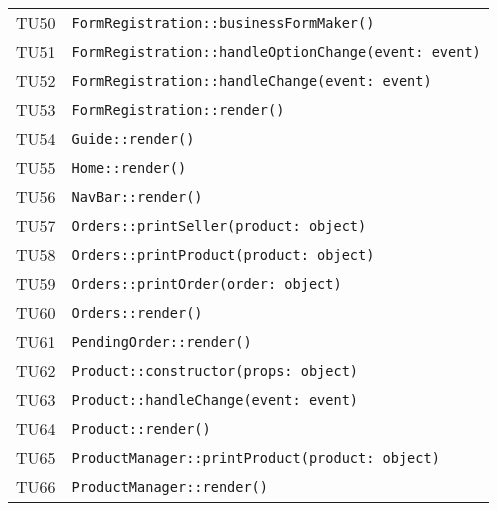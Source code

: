 \begin{longtable}{ >{\centering}p{} >{}p{}}
			\hypertarget{TU50}{TU50} & 
			\texttt{FormRegistration::businessFormMaker()}\\

			\hypertarget{TU51}{TU51} & 
			\texttt{FormRegistration::handleOptionChange(event: event)}\\
			
			\hypertarget{TU52}{TU52} & 
			\texttt{FormRegistration::handleChange(event: event)}\\

			\hypertarget{TU53}{TU53} & 
			\texttt{FormRegistration::render()}\\

			\hypertarget{TU54}{TU54} & 
			\texttt{Guide::render()}\\

			\hypertarget{TU55}{TU55} & 
			\texttt{Home::render()}\\

			\hypertarget{TU56}{TU56} & 
			\texttt{NavBar::render()}\\

			\hypertarget{TU57}{TU57} & 
			\texttt{Orders::printSeller(product: object)}\\

			\hypertarget{TU58}{TU58} & 
			\texttt{Orders::printProduct(product: object)}\\

			\hypertarget{TU59}{TU59} & 
			\texttt{Orders::printOrder(order: object)}\\

			\hypertarget{TU60}{TU60} & 
			\texttt{Orders::render()}\\

			\hypertarget{TU61}{TU61} & 
			\texttt{PendingOrder::render()}\\

			\hypertarget{TU62}{TU62} & 
			\texttt{Product::constructor(props: object)}\\

			\hypertarget{TU63}{TU63} & 
			\texttt{Product::handleChange(event: event)}\\

			\hypertarget{TU64}{TU64} & 
			\texttt{Product::render()}\\

			\hypertarget{TU65}{TU65} & 
			\texttt{ProductManager::printProduct(product: object)}\\

			\hypertarget{TU66}{TU66} & 
			\texttt{ProductManager::render()}\\


\end{longtable}
